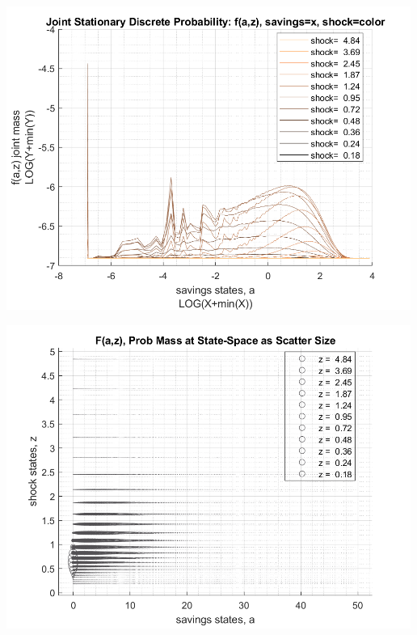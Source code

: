 \documentclass[
]{book}
\begin{document}
\includegraphics[width=5.20833in,height=\textheight]{img/fx_ds_az_cts_loop_images/figure_10.png}

\includegraphics[width=5.20833in,height=\textheight]{img/fx_ds_az_cts_loop_images/figure_11.png}
\end{document}

